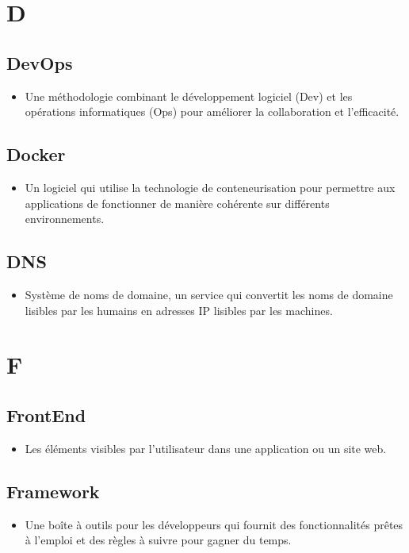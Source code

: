 \begin{multicols}{2}
    \section*{D}

    \subsection*{DevOps}
    \begin{itemize}
        \item Une méthodologie combinant le développement logiciel (Dev) et les opérations informatiques (Ops) pour améliorer la collaboration et l'efficacité.
    \end{itemize}

    \subsection*{Docker}
    \begin{itemize}
        \item Un logiciel qui utilise la technologie de conteneurisation pour permettre aux applications de fonctionner de manière cohérente sur différents environnements.
    \end{itemize}

    \subsection*{DNS}
    \begin{itemize}
        \item Système de noms de domaine, un service qui convertit les noms de domaine lisibles par les humains en adresses IP lisibles par les machines.
    \end{itemize}

    \section*{F}

    \subsection*{FrontEnd}
    \begin{itemize}
        \item Les éléments visibles par l'utilisateur dans une application ou un site web.
    \end{itemize}

    \subsection*{Framework}
    \begin{itemize}
        \item Une boîte à outils pour les développeurs qui fournit des fonctionnalités prêtes à l'emploi et des règles à suivre pour gagner du temps.
    \end{itemize}


\end{multicols}
